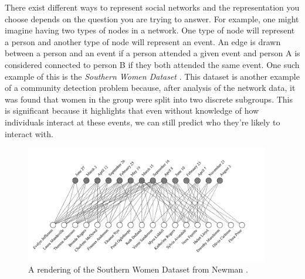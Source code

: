 There exist different ways to represent social networks and the representation you choose depends on the question you are trying to answer. For example, one might imagine having two types of nodes in a network. One type of node will represent a person and another type of node will represent an event. An edge is drawn between a person and an event if a person attended a given event and person A is considered connected to person B if they both attended the same event. One such example of this is the \emph{Southern Women Dataset} \cite{konect:southernwomen}. This dataset is another example of a community detection problem because, after analysis of the network data, it was found that women in the group were split into two discrete subgroups. This is significant because it highlights that even without knowledge of how individuals interact at these events, we can still predict who they're likely to interact with.

\begin{figure}
    \begin{center}
        \includegraphics[width=0.95\textwidth]{img/southern_women}
    \end{center}
    \caption{A rendering of the Southern Women Dataset from Newman  \cite[39]{newman10}.}
    \label{fig:southernwomen}
\end{figure}

